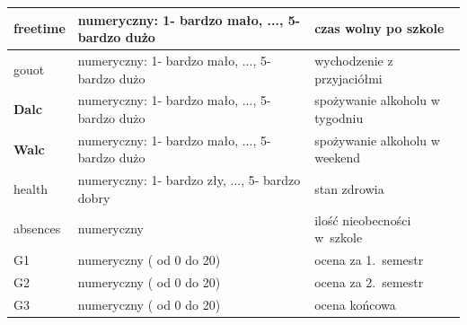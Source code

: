 \begin{figure}[h]
 \centering 
\end{figure}
\begin{table}[h!]
\begin{tabular}{|p{1.4cm}|p{3cm}|p{3cm}|}
\hline
freetime   &   numeryczny: 1- bardzo mało, ..., 5- bardzo dużo   & czas wolny po szkole   \\ \hline
gouot   &    numeryczny: 1- bardzo mało, ..., 5- bardzo dużo   &  wychodzenie z przyjaciółmi  \\ \hline
\textbf{Dalc}  &     numeryczny: 1- bardzo mało, ..., 5- bardzo dużo  & spożywanie alkoholu w tygodniu   \\ \hline
\textbf{Walc}   &    numeryczny: 1- bardzo mało, ..., 5- bardzo dużo   &  spożywanie alkoholu w weekend  \\ \hline
health   &  numeryczny: 1- bardzo zły, ..., 5- bardzo dobry    & stan zdrowia   \\ \hline
absences  &   numeryczny  &  ilość nieobecności w~szkole  \\ \hline
G1  &   numeryczny ( od 0 do 20)   &   ocena za 1.~semestr \\ \hline
G2  &   numeryczny ( od 0 do 20)     &  ocena za 2.~semestr  \\ \hline
G3   &    numeryczny ( od 0 do 20)     &  ocena końcowa  \\ \hline
\end{tabular}
\end{table}
\FloatBarrier
